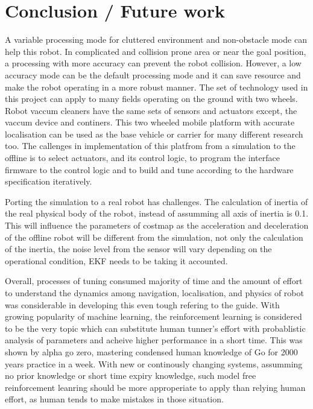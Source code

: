 \documentclass[10pt,journal,compsoc]{IEEEtran}
\begin{document}
\section{Conclusion / Future work}

A variable processing mode for cluttered environment and non-obstacle mode can help this robot. In complicated and collision prone area or near the goal position, a processing with more accuracy can prevent the robot collision. However, a low accuracy mode can be the default processing mode and it can save resource and make the robot operating in a more robust manner.
The set of technology used in this project can apply to many fields operating on the ground with two wheels. Robot vaccum cleaners have the same sets of sensors and actuators except, the vaccum device and continers. This two wheeled mobile platform with accurate localisation can be used as the base vehicle or carrier for many different research too. The callenges in implementation of this platfrom from a simulation to the offline is to select actuators, and its control logic, to program the interface firmware to the control logic and to build and tune according to the hardware specification iteratively.

Porting the simulation to a real robot has challenges. The calculation of inertia of the real physical body of the robot, instead of assumming all axis of inertia is 0.1. This will influence the parameters of costmap as the acceleration and deceleration of the offline robot will be different from the simulation, not only the calculation of the inertia, the noise level from the sensor will vary depending on the operational condition, EKF needs to be taking it accounted.

Overall, processes of tuning consumed majority of time and the amount of effort to understand the dynamics among navigation, localisation, and physics of robot was considerable in developing this even tough refering to the guide. With growing popularity of machine learning, the reinforcement learning is considered to be the very topic which can substitute human tunner's effort with probablistic analysis of parameters and acheive higher performance in a short time. This was shown by alpha go zero, mastering condensed human knowledge of Go for 2000 years  practice in a week. With new or continously changing systems, assumming no prior knowledge or short time expiry knowledge, such model free reinforcement leanring should be more approperiate to apply than relying human effort, as human tends to make mistakes in those situation.
\end{document}
